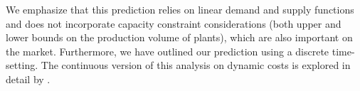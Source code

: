 We emphasize that this prediction relies on linear demand and supply functions and does not incorporate capacity constraint considerations (both upper and lower bounds on the production volume of plants), which are also important on the market.  Furthermore, we have outlined our prediction using a discrete time-setting. 
The continuous version of this analysis on dynamic costs is explored in detail by \cite{bergesmartimort2014}. 
%
%
%

